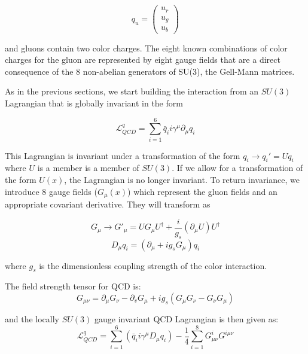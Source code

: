 	\begin{equation}
	q_{u} = 
	\begin{pmatrix}
		u_{r} \\
		u_{g}\\
		u_{b}
	\end{pmatrix}
	\end{equation}

and gluons contain two color charges. The eight known combinations of color charges for the gluon are represented by eight gauge fields that are a direct consequence of the 8 non-abelian generators of SU(3), the Gell-Mann matrices\cite{Cheng:1985bj}.

As in the previous sections, we start building the interaction from an $SU(3)$ Lagrangian that is globally invariant in the form

	\begin{equation}
	\mathcal{L}^{q}_{QCD} = \sum_{i=1}^{6}\bar{q}_{i}i\gamma^{\mu}\partial_{\mu}q_{i}
	\end{equation}

This Lagrangian is invariant under a transformation of the form $q_{i}\rightarrow q_{i}' = Uq_{i}$ where $U$ is a member is a member of $SU(3)$. If we allow for a transformation of the form $U(x)$, the Lagrangian is no longer invariant. To return invariance, we introduce 8 gauge fields ($G_{\mu}(x)$) which represent the gluon fields and an appropriate covariant derivative. They will transform as
	
		\begin{equation}
		G_{\mu}\rightarrow G'_{\mu} = UG_{\mu}U^{\dagger}+\frac{i}{g_{s}}(\partial_{\mu}U)U^{\dagger}
		\end{equation}
		\begin{equation}
		D_{\mu}q_{i} = (\partial_{\mu}+ig_{s}G_{\mu})q_{i}
		\end{equation}
		
where $g_{s}$ is the dimensionless coupling strength of the color interaction.

The field strength tensor for QCD is:
		\begin{equation}
		G_{\mu\nu} = \partial_{\mu}G_{\nu} - \partial_{v}G_{\mu} + ig_{s}(G_{\mu}G_{\nu} - G_{\nu}G_{\mu})
		\end{equation}

and the locally $SU(3)$ gauge invariant QCD Lagrangian is then given as:
		\begin{equation}
		\mathcal{L}^{q}_{QCD} = \sum_{i=1}^{6}(\bar{q}_{i}i\gamma^{\mu}D_{\mu}q_{i})-\frac{1}{4}\sum_{i=1}^{8}G_{\mu\nu}^{i}G^{i\mu\nu}
		\end{equation}

